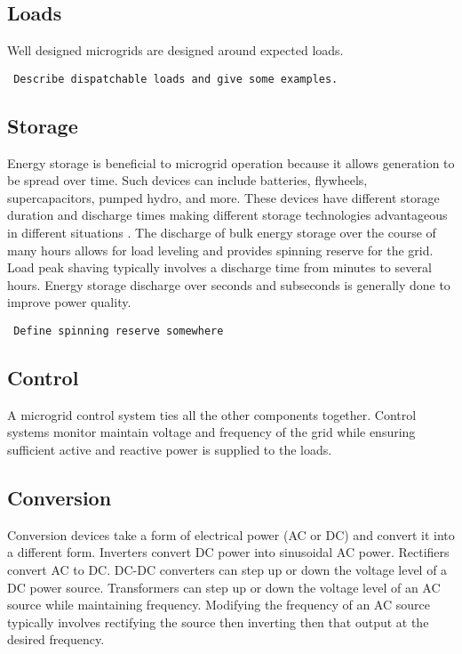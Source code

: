 \subsection{Loads}
Well designed microgrids are designed around expected loads. 
\begin{verbatim} 
 Describe dispatchable loads and give some examples. 
\end{verbatim}

\subsection{Storage}
Energy storage is beneficial to microgrid operation because it allows generation to be spread over time. Such devices can include batteries, flywheels, supercapacitors, pumped hydro, and more. These devices have different storage duration and discharge times making different storage technologies advantageous in different situations \cite{Schoenung2003}. The discharge of bulk energy storage over the course of many hours allows for load leveling and provides spinning reserve for the grid. Load peak shaving typically involves a discharge time from minutes to several hours. Energy storage discharge over seconds and subseconds is generally done to improve power quality.
\begin{verbatim}
 Define spinning reserve somewhere
\end{verbatim}

\subsection{Control}
A microgrid control system ties all the other components together. Control systems monitor maintain voltage and frequency of the grid while ensuring sufficient active and reactive power is supplied to the loads.

\subsection{Conversion}
Conversion devices take a form of electrical power (AC or DC) and convert it into a different form. Inverters convert DC power into sinusoidal AC power. Rectifiers convert AC to DC. DC-DC converters can step up or down the voltage level of a DC power source. Transformers can step up or down the voltage level of an AC source while maintaining frequency. Modifying the frequency of an AC source typically involves rectifying the source then inverting then that output at the desired frequency.

